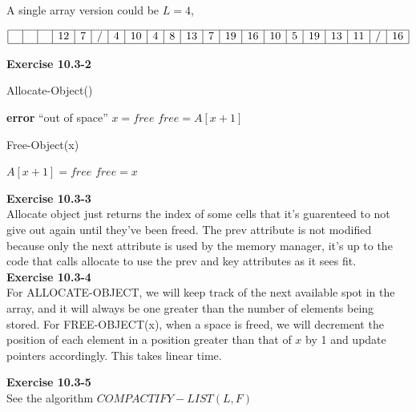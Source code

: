 \documentclass{article}
\begin{document}
A single array version could be $L=4$,

$
\begin{array}{|c|c|c|c|c|c|c|c|c|c|c|c|c|c|c|c|c|c|c|c|c|}
\hline
\,\,&\,\,&\,\,&12&7&/&4&10&4&8&13&7&19&16&10&5&19&13&11&/&16\\
\hline
\end{array}
$

\noindent\textbf{Exercise 10.3-2}\\

\begin{algorithm}
\caption{Allocate-Object()}
\begin{algorithmic}
	\State \textbf{error} ``out of space''
\Else
	\State $x = free$
	\State $free = A[x+1]$
\EndIf
\end{algorithmic}
\end{algorithm}

\begin{algorithm}
\caption{Free-Object(x)}
\begin{algorithmic}
\State $A[x+1] = free$
\State $free = x$
\end{algorithmic}
\end{algorithm}

\noindent\textbf{ Exercise 10.3-3} \\

Allocate object just returns the index of some cells that it's guarenteed to not give out again until they've been freed. The prev attribute is not modified because only the next attribute is used by the memory manager, it's up to the code that calls allocate to use the prev and key attributes as it sees fit.\\

\noindent\textbf{Exercise 10.3-4}\\

For ALLOCATE-OBJECT, we will keep track of the next available spot in the array, and it will always be one greater than the number of elements being stored.  For FREE-OBJECT(x), when a space is freed, we will decrement the position of each element in a position greater than that of $x$ by 1 and update pointers accordingly.  This takes linear time.

\noindent\textbf{ Exercise 10.3-5} \\

See the algorithm ${COMPACTIFY-LIST(L,F)}$
\end{document}
